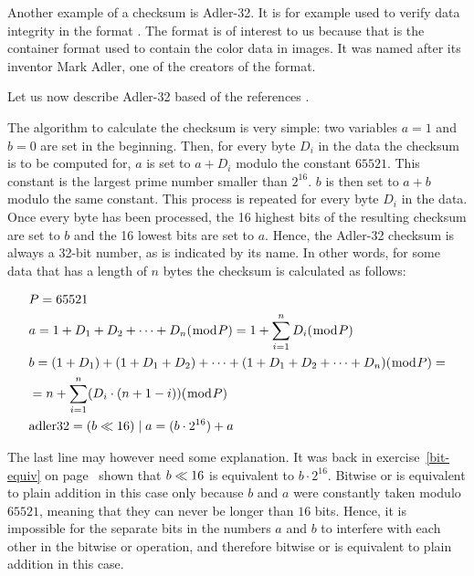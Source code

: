 \newcommand{\adlerchk}{Adler-32\xspace}

Another example of a checksum is \adlerchk. It is for example used to
verify data integrity in the \zlib format
\cite{gailly96:_zlib_compr_data_format_specif}. The \zlib format is of
interest to us because that is the container format used to contain
the color data in \png images. It was named after its inventor Mark
Adler, one of the creators of the \zlib format.

Let us now describe \adlerchk based of the references
\cite{gailly96:_zlib_compr_data_format_specif,maxino:_revis_fletc_adler_check,DBLP:journals-tdsc-MaxinoK09_koopman}.

The algorithm to calculate the checksum is very simple: two variables
$a=1$ and $b=0$ are set in the beginning. Then, for every byte $D_i$
in the data the checksum is to be computed for, $a$ is set to $a +
D_i$ modulo the constant $65521$. This constant is the largest prime
number smaller than $2^{16}$. $b$ is then set to $a + b$ modulo the
same constant.  This process is repeated for every byte $D_i$ in the
data. Once every byte has been processed, the 16 highest bits of the
resulting checksum are set to $b$ and the 16 lowest bits are set to
$a$. Hence, the \adlerchk checksum is always a 32-bit number, as is
indicated by its name. In other words, for some data that has a length
of $n$ bytes the checksum is calculated as follows:

\begin{align*}
    & P = 65521 \\
    & a = 1 + D_1 + D_2 + \dots + D_n (\bmod{P}) = 1 +
    \displaystyle\sum_{i = 1}^{n}D_i (\bmod{P}) \\
    & b = (1 + D_1) + (1 + D_1 + D_2) + \dots + (1 + D_1 + D_2 + \dots +
    D_n) (\bmod{P}) = \\
    & = n + \displaystyle\sum_{i = 1}^{n}(D_i \cdot (n + 1 - i))
    (\bmod{P}) \\
    & \text{adler32} = (b \ll 16) \mathrel{|} a = (b \cdot 2^{16}) + a
\end{align*}

The last line may however need some explanation. It was back in
exercise~\ref{bit-equiv} on page~\pageref{bit-equiv} shown that $b
\ll 16$ is equivalent to $b \cdot 2^{16}$. Bitwise or is
equivalent to plain addition in this case only because $b$ and $a$
were constantly taken modulo $65521$, meaning that they can never be
longer than $16$ bits. Hence, it is impossible for the separate bits
in the numbers $a$ and $b$ to interfere with each other in the bitwise
or operation, and therefore bitwise or is equivalent to plain addition
in this case.

